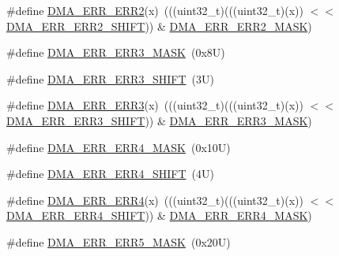 \begin{DoxyCompactItemize}
\#define \mbox{\hyperlink{group___d_m_a___register___masks_ga846455307421616646ea397b277cca6d}{D\+M\+A\+\_\+\+E\+R\+R\+\_\+\+E\+R\+R2}}(x)~(((uint32\+\_\+t)(((uint32\+\_\+t)(x)) $<$$<$ \mbox{\hyperlink{group___d_m_a___register___masks_ga0b5f35f4d12bff35a729fae491b7c50e}{D\+M\+A\+\_\+\+E\+R\+R\+\_\+\+E\+R\+R2\+\_\+\+S\+H\+I\+FT}})) \& \mbox{\hyperlink{group___d_m_a___register___masks_ga1951c1dbf65b90113283494a7f751606}{D\+M\+A\+\_\+\+E\+R\+R\+\_\+\+E\+R\+R2\+\_\+\+M\+A\+SK}})
\item 
\#define \mbox{\hyperlink{group___d_m_a___register___masks_gacd75b06f746d41c3e5753356fe88c7d5}{D\+M\+A\+\_\+\+E\+R\+R\+\_\+\+E\+R\+R3\+\_\+\+M\+A\+SK}}~(0x8\+U)
\item 
\#define \mbox{\hyperlink{group___d_m_a___register___masks_ga3ce969b44f6794b1514fca19857cefd2}{D\+M\+A\+\_\+\+E\+R\+R\+\_\+\+E\+R\+R3\+\_\+\+S\+H\+I\+FT}}~(3\+U)
\item 
\#define \mbox{\hyperlink{group___d_m_a___register___masks_gaa49d6df81bd5c660e6dc4b7eaa775339}{D\+M\+A\+\_\+\+E\+R\+R\+\_\+\+E\+R\+R3}}(x)~(((uint32\+\_\+t)(((uint32\+\_\+t)(x)) $<$$<$ \mbox{\hyperlink{group___d_m_a___register___masks_ga3ce969b44f6794b1514fca19857cefd2}{D\+M\+A\+\_\+\+E\+R\+R\+\_\+\+E\+R\+R3\+\_\+\+S\+H\+I\+FT}})) \& \mbox{\hyperlink{group___d_m_a___register___masks_gacd75b06f746d41c3e5753356fe88c7d5}{D\+M\+A\+\_\+\+E\+R\+R\+\_\+\+E\+R\+R3\+\_\+\+M\+A\+SK}})
\item 
\#define \mbox{\hyperlink{group___d_m_a___register___masks_gab9d5b6f1d6608d9949c68a1eeea555d2}{D\+M\+A\+\_\+\+E\+R\+R\+\_\+\+E\+R\+R4\+\_\+\+M\+A\+SK}}~(0x10\+U)
\item 
\#define \mbox{\hyperlink{group___d_m_a___register___masks_gac359bd7cc76f62c11333ff4c10de4a34}{D\+M\+A\+\_\+\+E\+R\+R\+\_\+\+E\+R\+R4\+\_\+\+S\+H\+I\+FT}}~(4\+U)
\item 
\#define \mbox{\hyperlink{group___d_m_a___register___masks_gac9e1fecaa9b190f1b741001d0e6209ae}{D\+M\+A\+\_\+\+E\+R\+R\+\_\+\+E\+R\+R4}}(x)~(((uint32\+\_\+t)(((uint32\+\_\+t)(x)) $<$$<$ \mbox{\hyperlink{group___d_m_a___register___masks_gac359bd7cc76f62c11333ff4c10de4a34}{D\+M\+A\+\_\+\+E\+R\+R\+\_\+\+E\+R\+R4\+\_\+\+S\+H\+I\+FT}})) \& \mbox{\hyperlink{group___d_m_a___register___masks_gab9d5b6f1d6608d9949c68a1eeea555d2}{D\+M\+A\+\_\+\+E\+R\+R\+\_\+\+E\+R\+R4\+\_\+\+M\+A\+SK}})
\item 
\#define \mbox{\hyperlink{group___d_m_a___register___masks_ga7d45ac13a2699e26fbe38ffab8cce416}{D\+M\+A\+\_\+\+E\+R\+R\+\_\+\+E\+R\+R5\+\_\+\+M\+A\+SK}}~(0x20\+U)
\item 
$$
\end{DoxyCompactItemize}
